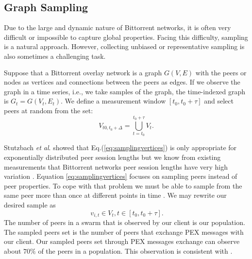 \documentclass[paper]{ieice}
\begin{document}
\subsection{Graph Sampling}
Due to the large and dynamic nature of Bittorrent networks, it is often very difficult or impossible to capture global properties. 
Facing this difficulty, sampling is a natural approach.
However, collecting unbiased or representative sampling is also sometimes a challenging task.

Suppose that a Bittorrent overlay network is a graph $G(V,E)$ with the peers or nodes as vertices and connections between the peers as edges. 
If we observe the graph in a time series,  i.e., we take samples of the graph, the time-indexed graph is $G_t = G(V_t,E_t)$.   
We define a measurement window $[t_0,t_0 + \tau]$ and select peers at random from the set:
 \begin{equation}
V_{t0,t_0+\Delta} = \bigcup_{t=t_0}^{t_0+\tau} V_t.
 \label{eq:samplingvertices}
 \end{equation}

Stutzbach \textit{et al}. \cite{stutzbach2007sampling} showed that  Eq.(\ref{eq:samplingvertices}) is only appropriate for exponentially distributed  peer session lengths but we know from existing measurements that Bittorrent networks peer session lengths have very high variation \cite{guo2005measurements}.  
Equation \ref{eq:samplingvertices} focuses on sampling peers instead of peer properties. 
To cope with that problem we must be able to sample from the same peer more than once at different points in time \cite{stutzbach2007sampling}. 
We may rewrite our desired sample as
\begin{equation}
\ v_{i,t} \in V_t  , t \in [t_0, t_0 + \tau].
\label{eq:samplingvertices2}
\end{equation}
The number of peers in a swarm that is observed by our client is our population. 
The sampled peers set is the number of peers that exchange PEX messages with our client.
Our sampled peers set through PEX messages exchange can observe about $70\%$ of the peers in a population.
This observation is consistent with \cite{wu2010understanding}.

\end{document}
